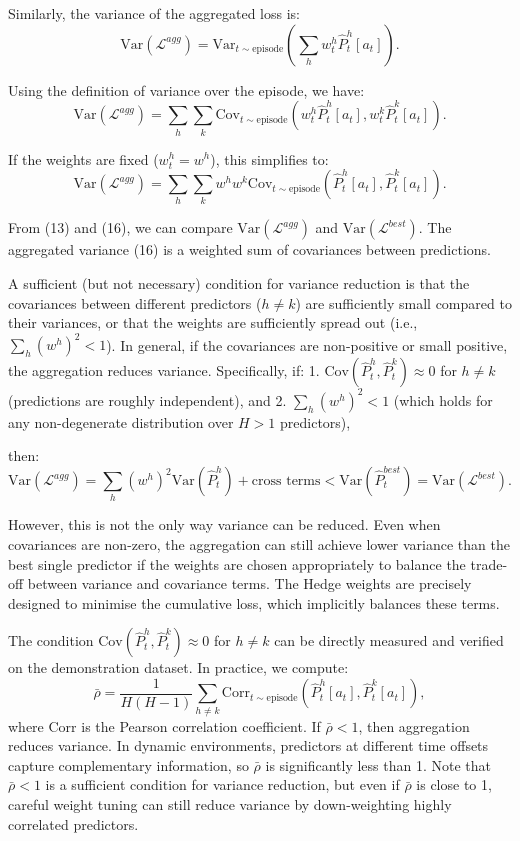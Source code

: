 \documentclass[11pt]{article}
\begin{document}
Similarly, the variance of the aggregated loss is:
\[
\text{Var}(\mathcal{L}^{agg})
=
\text{Var}_{t \sim \text{episode}} \left( \sum_h w^h_t \hat{P}^h_t[a_t] \right). \tag{14}
\]

Using the definition of variance over the episode, we have:
\[
\text{Var}(\mathcal{L}^{agg})
=
\sum_h \sum_k
\text{Cov}_{t \sim \text{episode}} \left( w^h_t \hat{P}^h_t[a_t], w^k_t \hat{P}^k_t[a_t] \right). \tag{15}
\]

If the weights are fixed (\(w^h_t = w^h\)), this simplifies to:
\[
\text{Var}(\mathcal{L}^{agg})
=
\sum_h \sum_k w^h w^k
\text{Cov}_{t \sim \text{episode}} \left( \hat{P}^h_t[a_t], \hat{P}^k_t[a_t] \right). \tag{16}
\]

From (13) and (16), we can compare \(\text{Var}(\mathcal{L}^{agg})\) and \(\text{Var}(\mathcal{L}^{best})\). The aggregated variance (16) is a weighted sum of covariances between predictions. 

A sufficient (but not necessary) condition for variance reduction is that the covariances between different predictors (\(h \neq k\)) are sufficiently small compared to their variances, or that the weights are sufficiently spread out (i.e., \(\sum_h (w^h)^2 < 1\)). In general, if the covariances are non-positive or small positive, the aggregation reduces variance. Specifically, if:
1. \(\text{Cov}(\hat{P}^h_t, \hat{P}^k_t) \approx 0\) for \(h \neq k\) (predictions are roughly independent), and
2. \(\sum_h (w^h)^2 < 1\) (which holds for any non-degenerate distribution over \(H > 1\) predictors),

then:
\[
\text{Var}(\mathcal{L}^{agg})
=
\sum_h (w^h)^2 \text{Var}(\hat{P}^h_t) + \text{cross terms}
<
\text{Var}(\hat{P}^{best}_t)
=
\text{Var}(\mathcal{L}^{best}). \tag{17}
\]

However, this is not the only way variance can be reduced. Even when covariances are non-zero, the aggregation can still achieve lower variance than the best single predictor if the weights are chosen appropriately to balance the trade-off between variance and covariance terms. The Hedge weights are precisely designed to minimise the cumulative loss, which implicitly balances these terms.

The condition \(\text{Cov}(\hat{P}^h_t, \hat{P}^k_t) \approx 0\) for \(h \neq k\) can be directly measured and verified on the demonstration dataset. In practice, we compute:
\[
\bar{\rho} = \frac{1}{H(H-1)} \sum_{h \neq k}
\text{Corr}_{t \sim \text{episode}} \left( \hat{P}^h_t[a_t], \hat{P}^k_t[a_t] \right), \tag{18}
\]
where \(\text{Corr}\) is the Pearson correlation coefficient. If \(\bar{\rho} < 1\), then aggregation reduces variance. In dynamic environments, predictors at different time offsets capture complementary information, so \(\bar{\rho}\) is significantly less than 1. Note that \(\bar{\rho} < 1\) is a sufficient condition for variance reduction, but even if \(\bar{\rho}\) is close to 1, careful weight tuning can still reduce variance by down-weighting highly correlated predictors.
\end{document}
